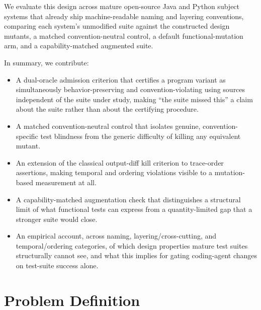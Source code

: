 \documentclass[11pt]{article}
\begin{document}
We evaluate this design across mature open-source Java and Python subject systems that already ship machine-readable naming and layering conventions, comparing each system's unmodified suite against the constructed design mutants, a matched convention-neutral control, a default functional-mutation arm, and a capability-matched augmented suite.

In summary, we contribute:
\begin{itemize}[leftmargin=1.4em]
\item A dual-oracle admission criterion that certifies a program variant as simultaneously behavior-preserving and convention-violating using sources independent of the suite under study, making ``the suite missed this'' a claim about the suite rather than about the certifying procedure.
\item A matched convention-neutral control that isolates genuine, convention-specific test blindness from the generic difficulty of killing any equivalent mutant.
\item An extension of the classical output-diff kill criterion to trace-order assertions, making temporal and ordering violations visible to a mutation-based measurement at all.
\item A capability-matched augmentation check that distinguishes a structural limit of what functional tests can express from a quantity-limited gap that a stronger suite would close.
\item An empirical account, across naming, layering/cross-cutting, and temporal/ordering categories, of which design properties mature test suites structurally cannot see, and what this implies for gating coding-agent changes on test-suite success alone.
\end{itemize}

\section{Problem Definition}
\end{document}
